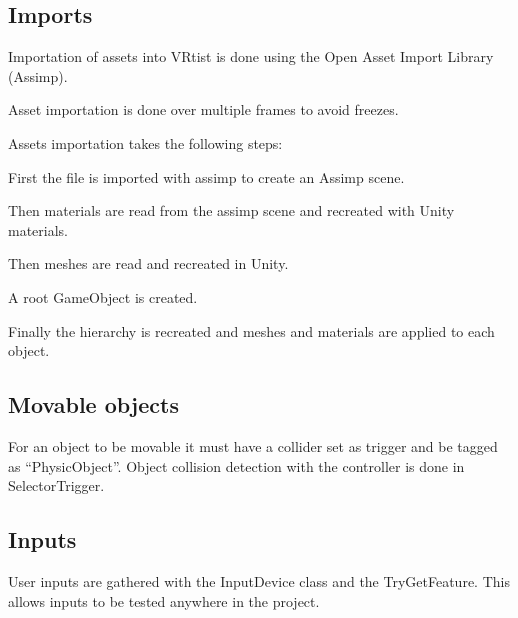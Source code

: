 \documentclass[letterpaper,10pt,english,openany,oneside]{sphinxmanual}
\begin{document}
\subsection{Imports}
\label{\detokenize{ScriptReferences/Script:imports}}
\begin{DUlineblock}{0em}
\item[] Importation of assets into VRtist is done using the Open Asset Import Library (Assimp).
\item[] Asset importation is done over multiple frames to avoid freezes.
\item[] 
\item[] Assets importation takes the following steps:
\item[] First the file is imported with assimp to create an Assimp scene.
\item[] Then materials are read from the assimp scene and recreated with Unity materials.
\item[] Then meshes are read and recreated in Unity.
\item[] A root GameObject is created.
\item[] Finally the hierarchy is recreated and meshes and materials are applied to each object.
\end{DUlineblock}


\subsection{Movable objects}
\label{\detokenize{ScriptReferences/Script:movable-objects}}
\begin{DUlineblock}{0em}
\item[] For an object to be movable it must have a collider set as trigger and be tagged as “PhysicObject”. Object collision detection with the controller is done in SelectorTrigger.
\end{DUlineblock}


\subsection{Inputs}
\label{\detokenize{ScriptReferences/Script:inputs}}
\begin{DUlineblock}{0em}
\item[] User inputs are gathered with the InputDevice class and the TryGetFeature. This allows inputs to be tested anywhere in the project.
\end{DUlineblock}
\end{document}
